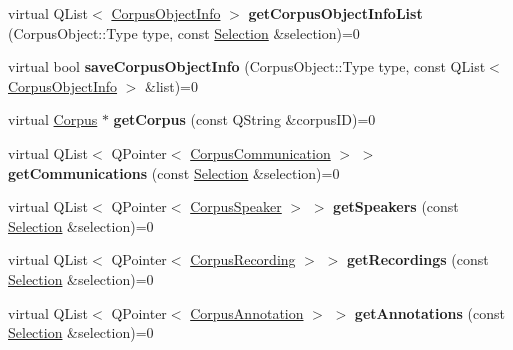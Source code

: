 \begin{DoxyCompactItemize}
virtual Q\+List$<$ \hyperlink{class_corpus_object_info}{Corpus\+Object\+Info} $>$ {\bfseries get\+Corpus\+Object\+Info\+List} (Corpus\+Object\+::\+Type type, const \hyperlink{class_metadata_datastore_1_1_selection}{Selection} \&selection)=0
\item 
\mbox{\label{class_metadata_datastore_a1069ec1519ef4df0cbe6cc6a5c2b89d9}} 
virtual bool {\bfseries save\+Corpus\+Object\+Info} (Corpus\+Object\+::\+Type type, const Q\+List$<$ \hyperlink{class_corpus_object_info}{Corpus\+Object\+Info} $>$ \&list)=0
\item 
\mbox{\label{class_metadata_datastore_a7f3b6e360cfed18f05a4d6cec62c8a7e}} 
virtual \hyperlink{class_corpus}{Corpus} $\ast$ {\bfseries get\+Corpus} (const Q\+String \&corpus\+ID)=0
\item 
\mbox{\label{class_metadata_datastore_a4d9bf9d6225058d629bf8506e1591157}} 
virtual Q\+List$<$ Q\+Pointer$<$ \hyperlink{class_corpus_communication}{Corpus\+Communication} $>$ $>$ {\bfseries get\+Communications} (const \hyperlink{class_metadata_datastore_1_1_selection}{Selection} \&selection)=0
\item 
\mbox{\label{class_metadata_datastore_a906144daa5f9d266eb606a1ec3e6ffb7}} 
virtual Q\+List$<$ Q\+Pointer$<$ \hyperlink{class_corpus_speaker}{Corpus\+Speaker} $>$ $>$ {\bfseries get\+Speakers} (const \hyperlink{class_metadata_datastore_1_1_selection}{Selection} \&selection)=0
\item 
\mbox{\label{class_metadata_datastore_a006193b3b7aee4636fed4d5b5fcc757b}} 
virtual Q\+List$<$ Q\+Pointer$<$ \hyperlink{class_corpus_recording}{Corpus\+Recording} $>$ $>$ {\bfseries get\+Recordings} (const \hyperlink{class_metadata_datastore_1_1_selection}{Selection} \&selection)=0
\item 
\mbox{\label{class_metadata_datastore_a28dc1a603e35c66863a6b7adfd3ec666}} 
virtual Q\+List$<$ Q\+Pointer$<$ \hyperlink{class_corpus_annotation}{Corpus\+Annotation} $>$ $>$ {\bfseries get\+Annotations} (const \hyperlink{class_metadata_datastore_1_1_selection}{Selection} \&selection)=0
\item 
\mbox{\label{class_metadata_datastore_afe022298bafc27727cd7402a53dcb53e}} 

\end{DoxyCompactItemize}
